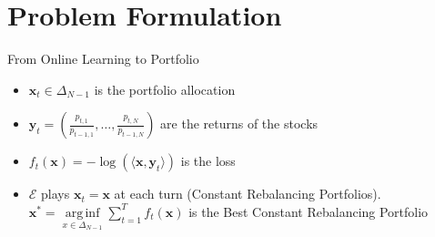 \documentclass[10pt]{beamer}
\DeclareMathOperator*{\arginf}{arg\,inf}
\begin{document}
\section{Problem Formulation}

\begin{frame}{From Online Learning to Portfolio}

\begin{itemize}
\item $\mathbf x_t\in\Delta_{N-1}$ is the portfolio allocation
\item $\mathbf y_t=\left(\frac{p_{t,1}}{p_{t-1,1}},\ldots,\frac{p_{t,N}}{p_{t-1,N}}\right)$ are the returns of the stocks
\item $f_t(\mathbf x)=-\log(\langle\mathbf x,\mathbf y_t\rangle)$ is the loss
\item $\mathcal E$ plays $\mathbf x_t=\mathbf x$ at each turn (Constant Rebalancing Portfolios). $\mathbf x^*=\arginf\limits_{x\in\Delta_{N-1}}\sum\limits_{t=1}^Tf_t(\mathbf x)$ is the Best Constant Rebalancing Portfolio
\end{itemize}



\end{frame}
\end{document}

